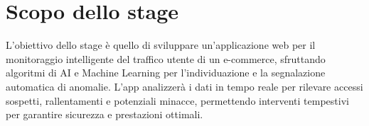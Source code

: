 \section*{Scopo dello stage}
L’obiettivo dello stage è quello di sviluppare un’applicazione web per il monitoraggio intelligente del traffico utente di un e-commerce, sfruttando algoritmi di AI e Machine Learning per l’individuazione e la segnalazione automatica di anomalie. L’app analizzerà i dati in tempo reale per rilevare accessi sospetti, rallentamenti e potenziali minacce, permettendo interventi tempestivi per garantire sicurezza e prestazioni ottimali.

